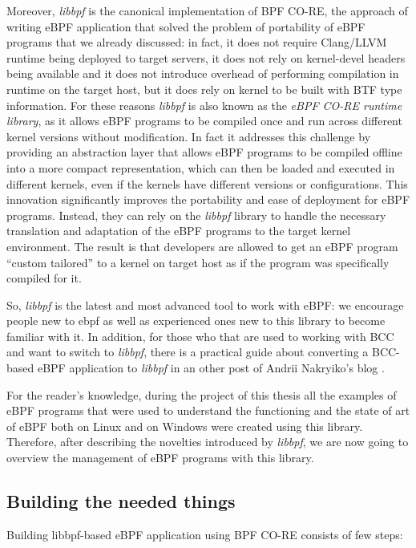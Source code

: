 Moreover, \textit{libbpf} is the canonical implementation of BPF CO-RE, the approach of writing eBPF application that solved the problem of portability of eBPF programs that we already discussed: in fact, it does not require Clang/LLVM runtime being deployed to target servers, it does not rely on kernel-devel headers being available and it does not introduce overhead of performing compilation in runtime on the target host, but it does rely on kernel to be built with BTF type information.
For these reasons \textit{libbpf} is also known as the \textit{eBPF CO-RE runtime library}, as it allows eBPF programs to be compiled once and run across different kernel versions without modification.
In fact it addresses this challenge by providing an abstraction layer that allows eBPF programs to be compiled offline into a more compact representation, which can then be loaded and executed in different kernels, even if the kernels have different versions or configurations.
This innovation significantly improves the portability and ease of deployment for eBPF programs.
Instead, they can rely on the \textit{libbpf} library to handle the necessary translation and adaptation of the eBPF programs to the target kernel environment.
The result is that developers are allowed to get an eBPF program ``custom tailored'' to a kernel on target host as if the program was specifically compiled for it.

So, \textit{libbpf} is the latest and most advanced tool to work with eBPF: we encourage people new to ebpf as well as experienced ones new to this library to become familiar with it.
In addition, for those who that are used to working with BCC and want to switch to \textit{libbpf}, there is a practical guide about converting a BCC-based eBPF application to \textit{libbpf} in an other post of Andrii Nakryiko's blog \cite{BCCTolibbpfGuide}.

For the reader's knowledge, during the project of this thesis all the examples of eBPF programs that were used to understand the functioning and the state of art of eBPF both on Linux and on Windows were created using this library.
Therefore, after describing the novelties introduced by \textit{libbpf}, we are now going to overview the management of eBPF programs with this library.

\subsection{Building the needed things}

Building libbpf-based eBPF application using BPF CO-RE consists of few steps:

